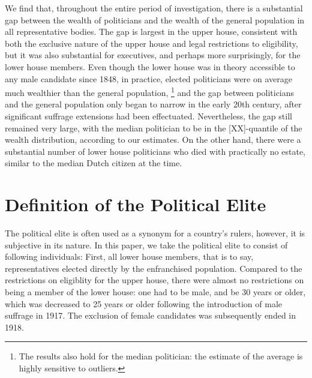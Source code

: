 We find that, throughout the entire period of investigation, there is a substantial gap between the wealth of politicians and the wealth of the general population in all representative bodies. The gap is largest in the upper house, consistent with both the exclusive nature of the upper house and legal restrictions to eligibility, but it was also substantial for executives, and perhaps more surprisingly, for the lower house members. Even though the lower house was in theory accessible to any male candidate since 1848, in practice, elected politicians were on average much wealthier than the general population, \footnote{The results also hold for the median politician: the estimate of the average is highly sensitive to outliers.} and the gap between politicians and the general population only began to narrow in the early 20th century, after significant suffrage extensions had been effectuated. Nevertheless, the gap still remained very large, with the median politician to be in the [XX]-quantile of the wealth distribution, according to our estimates. On the other hand, there were a substantial number of lower house politicians who died with practically no estate, similar to the median Dutch citizen at the time. 


\section{Definition of the Political Elite}
The political elite is often used as a synonym for a country's rulers, however, it is subjective in its nature. In this paper, we take the political elite to consist of following individuals: First, all lower house members, that is to say, representatives elected directly by the enfranchised population. Compared to the restrictions on eligiblity for the upper house, there were almost no restrictions on being a member of the lower house: one had to be male, and be 30 years or older, which was decreased to 25 years or older following the introduction of male suffrage in 1917. The exclusion of female candidates was subsequently ended in 1918. 

